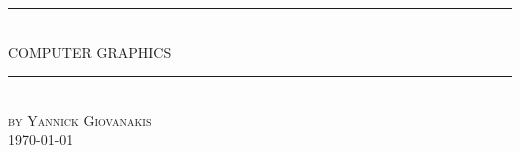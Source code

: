 \documentclass[12pt]{article} %
\begin{document}

\begin{titlepage}

\newcommand{\HRule}{\rule{\linewidth}{0.5mm}} %

\center %
\HRule \\[0.5cm]
{ \LARGE  COMPUTER GRAPHICS}\\[0.8cm] %
\HRule \\[1.5cm]
\textsc{\large by Yannick Giovanakis}\\[5.5cm] %

\vfill
{\large \today}\\[3cm] %
\end{titlepage}


\tableofcontents %

\newpage %
\end{document}
